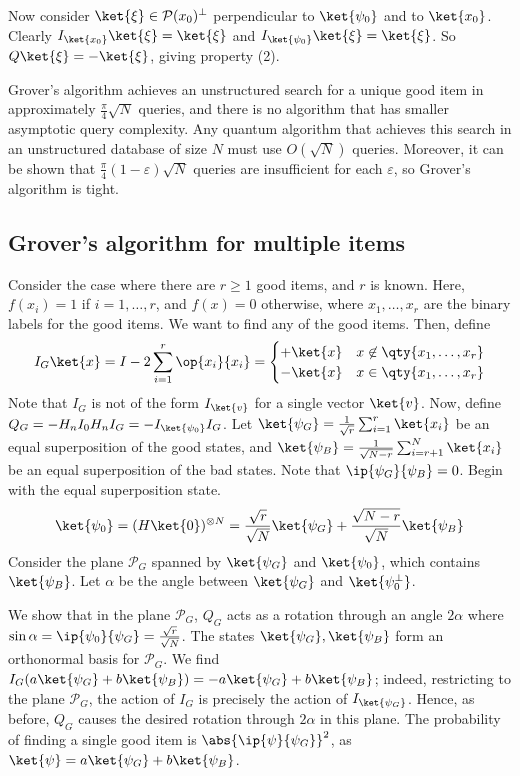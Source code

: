 Now consider $\ket{\xi} \in \mathcal P(x_0)^\perp$ perpendicular to $\ket{\psi_0}$ and to $\ket{x_0}$.
Clearly $I_{\ket{x_0}} \ket{\xi} = \ket{\xi}$ and $I_{\ket{\psi_0}} \ket{\xi} = \ket{\xi}$.
So $Q \ket{\xi} = -\ket{\xi}$, giving property (2).

Grover's algorithm achieves an unstructured search for a unique good item in approximately $\frac{\pi}{4}\sqrt{N}$ queries, and there is no algorithm that has smaller asymptotic query complexity.
Any quantum algorithm that achieves this search in an unstructured database of size $N$ must use $O(\sqrt{N})$ queries.
Moreover, it can be shown that $\frac{\pi}{4} (1 - \varepsilon) \sqrt{N}$ queries are insufficient for each $\varepsilon$, so Grover's algorithm is tight.

\subsection{Grover's algorithm for multiple items}
Consider the case where there are $r \geq 1$ good items, and $r$ is known.
Here, $f(x_i) = 1$ if $i = 1, \dots, r$, and $f(x) = 0$ otherwise, where $x_1, \dots, x_r$ are the binary labels for the good items.
We want to find any of the good items.
Then, define
\[ I_G \ket{x} = I - 2\sum_{i=1}^r \op{x_i}{x_i} = \begin{cases}
    +\ket{x} & x \not\in \qty{x_1, \dots, x_r} \\
    -\ket{x} & x \in \qty{x_1, \dots, x_r}
\end{cases} \]
Note that $I_G$ is not of the form $I_{\ket{v}}$ for a single vector $\ket{v}$.
Now, define $Q_G = -H_n I_0 H_n I_G = -I_{\ket{\psi_0}} I_G$.
Let $\ket{\psi_G} = \frac{1}{\sqrt{r}} \sum_{i=1}^r \ket{x_i}$ be an equal superposition of the good states, and $\ket{\psi_B} = \frac{1}{\sqrt{N-r}} \sum_{i=r+1}^N \ket{x_i}$ be an equal superposition of the bad states.
Note that $\ip{\psi_G}{\psi_B} = 0$.
Begin with the equal superposition state.
\[ \ket{\psi_0} = (H\ket{0})^{\otimes N} = \frac{\sqrt{r}}{\sqrt{N}} \ket{\psi_G} + \frac{\sqrt{N-r}}{\sqrt{N}} \ket{\psi_B} \]
Consider the plane $\mathcal P_G$ spanned by $\ket{\psi_G}$ and $\ket{\psi_0}$, which contains $\ket{\psi_B}$.
Let $\alpha$ be the angle between $\ket{\psi_G}$ and $\ket{\psi_0^\perp}$.

We show that in the plane $\mathcal P_G$, $Q_G$ acts as a rotation through an angle $2\alpha$ where $\sin \alpha = \ip{\psi_0}{\psi_G} = \frac{\sqrt{r}}{\sqrt{N}}$.
The states $\ket{\psi_G}, \ket{\psi_B}$ form an orthonormal basis for $\mathcal P_G$.
We find $I_G (a \ket{\psi_G} + b \ket{\psi_B}) = -a \ket{\psi_G} + b \ket{\psi_B}$; indeed, restricting to the plane $\mathcal P_G$, the action of $I_G$ is precisely the action of $I_{\ket{\psi_G}}$.
Hence, as before, $Q_G$ causes the desired rotation through $2\alpha$ in this plane.
The probability of finding a single good item is $\abs{\ip{\psi}{\psi_G}}^2$, as $\ket{\psi} = a \ket{\psi_G} + b \ket{\psi_B}$.

